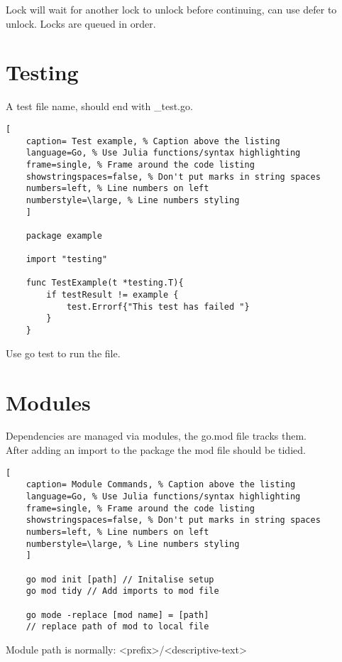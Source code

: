 \documentclass[11pt]{scrartcl} %
\begin{document}
Lock will wait for another lock to unlock before continuing, can use defer to unlock. Locks are queued
in order.

\section{Testing}

A test file name, should end with \_test.go.

\begin{lstlisting}[
	caption= Test example, % Caption above the listing
	language=Go, % Use Julia functions/syntax highlighting
	frame=single, % Frame around the code listing
	showstringspaces=false, % Don't put marks in string spaces
	numbers=left, % Line numbers on left
	numberstyle=\large, % Line numbers styling
	]

	package example

	import "testing"

	func TestExample(t *testing.T){
		if testResult != example {
			test.Errorf{"This test has failed "}
		}
	}

\end{lstlisting}

Use go test to run the file.

\section{Modules}

Dependencies are managed via modules, the go.mod file tracks them.\\

After adding an import to the package the mod file should be tidied.

\begin{lstlisting}[
	caption= Module Commands, % Caption above the listing
	language=Go, % Use Julia functions/syntax highlighting
	frame=single, % Frame around the code listing
	showstringspaces=false, % Don't put marks in string spaces
	numbers=left, % Line numbers on left
	numberstyle=\large, % Line numbers styling
	]

	go mod init [path] // Initalise setup
	go mod tidy // Add imports to mod file

	go mode -replace [mod name] = [path]
	// replace path of mod to local file

\end{lstlisting}

Module path is normally: <prefix>/<descriptive-text> \\
\end{document}
